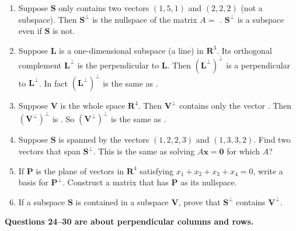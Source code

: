 \documentclass[14pt, a4paper]{article}
\begin{document}
\begin{enumerate}[resume]
    \item Suppose $\mathbf{S}$ only contains two vectors $(1, 5, 1)$ and $(2, 2, 2)$ (not a subspace). Then $\mathbf{S}^{\perp}$ is the nullspace of the matrix $A =$ \underline{\hspace{2cm}}. $\mathbf{S}^{\perp}$ is a subspace even if $\mathbf{S}$ is not.

    \item Suppose $\mathbf{L}$ is a one-dimensional subspace (a line) in $\mathbf{R}^3$. Its orthogonal complement $\mathbf{L}^{\perp}$ is the \underline{\hspace{2cm}} perpendicular to $\mathbf{L}$. Then $(\mathbf{L}^{\perp})^{\perp}$ is a \underline{\hspace{2cm}} perpendicular to $\mathbf{L}^{\perp}$. In fact $(\mathbf{L}^{\perp})^{\perp}$ is the same as \underline{\hspace{2cm}}.

    \item Suppose $\mathbf{V}$ is the whole space $\mathbf{R}^4$. Then $\mathbf{V}^{\perp}$ contains only the vector \underline{\hspace{2cm}}. Then $(\mathbf{V}^{\perp})^{\perp}$ is \underline{\hspace{2cm}}. So $(\mathbf{V}^{\perp})^{\perp}$ is the same as \underline{\hspace{2cm}}.

    \item Suppose $\mathbf{S}$ is spanned by the vectors $(1, 2, 2, 3)$ and $(1, 3, 3, 2)$. Find two vectors that span $\mathbf{S}^{\perp}$. This is the same as solving $A\boldsymbol{x} = \boldsymbol{0}$ for which $A$?

    \item If $\mathbf{P}$ is the plane of vectors in $\mathbf{R}^4$ satisfying $x_1 + x_2 + x_3 + x_4 = 0$, write a basis for $\mathbf{P}^{\perp}$. Construct a matrix that has $\mathbf{P}$ as its nullspace.

    \item If a subspace $\mathbf{S}$ is contained in a subspace $\mathbf{V}$, prove that $\mathbf{S}^{\perp}$ contains $\mathbf{V}^{\perp}$.
\end{enumerate}

\noindent \textbf{Questions 24--30 are about perpendicular columns and rows.}
\end{document}
